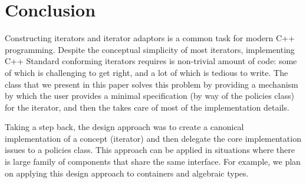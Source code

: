 \documentclass{netobjectdays}
\begin{document}
\section{Conclusion}

Constructing iterators and iterator adaptors is a common task for
modern C++ programming. Despite the conceptual simplicity of most
iterators, implementing {C++} Standard conforming iterators requires
is non-trivial amount of code: some of which is challenging to get
right, and a lot of which is tedious to write. The
 class that we present in this paper solves
this problem by providing a mechanism by which the user provides a
minimal specification (by way of the policies class) for the iterator,
and then the  takes care of most of the
implementation details.

Taking a step back, the design approach was to create a canonical
implementation of a concept (iterator) and then delegate the core
implementation issues to a policies class. This approach can be
applied in situations where there is large family of components that
share the same interface. For example, we plan on applying this design
approach to containers and algebraic types.




\end{document}
